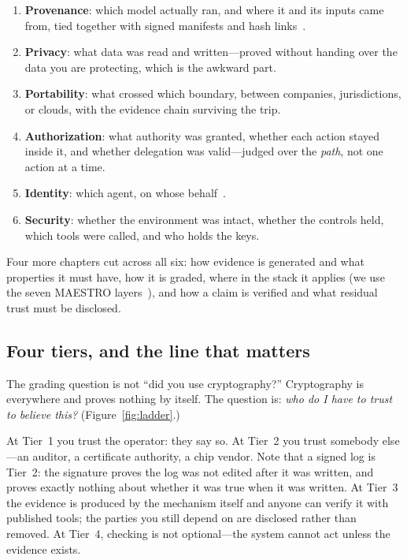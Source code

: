 \documentclass[11pt]{article}
\begin{document}
\begin{enumerate}[itemsep=1pt,topsep=2pt]
\item \textbf{Provenance}: which model actually ran, and where it and its
inputs came from, tied together with signed manifests and hash
links~\cite{slsa,c2pa}.
\item \textbf{Privacy}: what data was read and written---proved without
handing over the data you are protecting, which is the awkward part.
\item \textbf{Portability}: what crossed which boundary, between companies,
jurisdictions, or clouds, with the evidence chain surviving the trip.
\item \textbf{Authorization}: what authority was granted, whether each action
stayed inside it, and whether delegation was valid---judged over the
\emph{path}, not one action at a time.
\item \textbf{Identity}: which agent, on whose behalf~\cite{w3cdid,w3cvc2}.
\item \textbf{Security}: whether the environment was intact, whether the
controls held, which tools were called, and who holds the keys.
\end{enumerate}

Four more chapters cut across all six: how evidence is generated and what
properties it must have, how it is graded, where in the stack it applies
(we use the seven MAESTRO layers~\cite{csamaestro}), and how a claim is
verified and what residual trust must be disclosed.

\subsection{Four tiers, and the line that matters}
\label{sec:tiers}

The grading question is not ``did you use cryptography?'' Cryptography is
everywhere and proves nothing by itself. The question is: \emph{who do I have
to trust to believe this?} (Figure~\ref{fig:ladder}.)

At Tier~1 you trust the operator: they say so. At Tier~2 you trust somebody
else---an auditor, a certificate authority, a chip vendor. Note that a signed
log is Tier~2: the signature proves the log was not edited after it was
written, and proves exactly nothing about whether it was true when it was
written. At Tier~3 the evidence is produced by the mechanism itself and
anyone can verify it with published tools; the parties you still depend on are
disclosed rather than removed. At Tier~4, checking is not optional---the
system cannot act unless the evidence exists.
\end{document}
